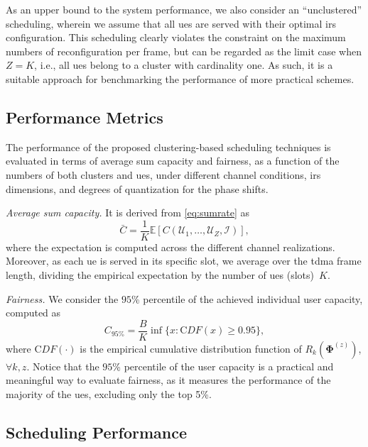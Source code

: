 As an upper bound to the system performance, we also consider an ``unclustered'' scheduling, wherein we assume that all \glspl{ue} are served with their optimal \gls{irs} configuration. This scheduling clearly violates the constraint on the maximum numbers of reconfiguration per frame,  but can be regarded as the limit case when $Z = K$, i.e., all \glspl{ue} belong to a cluster with cardinality one. As such, it is a suitable approach for benchmarking the performance of more practical schemes.

\subsection{Performance Metrics}
\label{sec:metrics}

The performance of the proposed clustering-based scheduling techniques is evaluated in terms of average sum capacity and fairness, as a function of the numbers of both clusters and \glspl{ue}, under different channel conditions, \gls{irs} dimensions, and degrees of quantization for the phase shifts.

\emph{Average sum capacity.} 
It is derived from \eqref{eq:sumrate} as
\begin{equation}
    \bar{C} = \frac{1}{K}\mathbb{E}\left[C(\mathcal{U}_1,\ldots,\mathcal{U}_{Z},\mathcal{I})\right],
\end{equation}
where the expectation is computed across the different channel realizations. Moreover, as each \gls{ue} is served in its specific slot, we average over the  \gls{tdma} frame length, dividing the empirical expectation by the number of \glspl{ue} (slots)~$K$.  

\emph{Fairness.}
We consider the $95$\% percentile of the achieved individual user capacity, computed as
\begin{equation}\label{C95}
    C_{95\%} = \frac{B}{K}\inf\{x: {\mathrm CDF}(x) \geq 0.95\},
\end{equation}
where ${\mathrm CDF}(\cdot)$ is the empirical cumulative distribution function  of $R_k(\bm{\Phi}^{(z)})$, $\forall k, z$.
Notice that the $95$\% percentile of the user capacity is a practical and meaningful way to evaluate fairness, as it measures the performance of the majority of the \glspl{ue}, excluding only the top 5\%.

\subsection{Scheduling Performance}
\label{sub:results}


